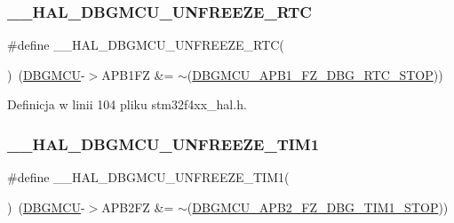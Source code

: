 \subsubsection{\texorpdfstring{\+\_\+\+\_\+\+H\+A\+L\+\_\+\+D\+B\+G\+M\+C\+U\+\_\+\+U\+N\+F\+R\+E\+E\+Z\+E\+\_\+\+R\+TC}{\_\_HAL\_DBGMCU\_UNFREEZE\_RTC}}
{\footnotesize\ttfamily \#define \+\_\+\+\_\+\+H\+A\+L\+\_\+\+D\+B\+G\+M\+C\+U\+\_\+\+U\+N\+F\+R\+E\+E\+Z\+E\+\_\+\+R\+TC(\begin{DoxyParamCaption}{ }\end{DoxyParamCaption})~(\hyperlink{group___peripheral__declaration_ga92ec6d9ec2251fda7d4ce09748cd74b4}{D\+B\+G\+M\+CU}-\/$>$A\+P\+B1\+FZ \&= $\sim$(\hyperlink{group___peripheral___registers___bits___definition_ga1e20246d389229ff46006b405bb56b1d}{D\+B\+G\+M\+C\+U\+\_\+\+A\+P\+B1\+\_\+\+F\+Z\+\_\+\+D\+B\+G\+\_\+\+R\+T\+C\+\_\+\+S\+T\+OP}))}



Definicja w linii 104 pliku stm32f4xx\+\_\+hal.\+h.

\mbox{\label{group___h_a_l___exported___macros_ga2f91eec9f9a424ab611be0e770c6692e}} 
\subsubsection{\texorpdfstring{\+\_\+\+\_\+\+H\+A\+L\+\_\+\+D\+B\+G\+M\+C\+U\+\_\+\+U\+N\+F\+R\+E\+E\+Z\+E\+\_\+\+T\+I\+M1}{\_\_HAL\_DBGMCU\_UNFREEZE\_TIM1}}
{\footnotesize\ttfamily \#define \+\_\+\+\_\+\+H\+A\+L\+\_\+\+D\+B\+G\+M\+C\+U\+\_\+\+U\+N\+F\+R\+E\+E\+Z\+E\+\_\+\+T\+I\+M1(\begin{DoxyParamCaption}{ }\end{DoxyParamCaption})~(\hyperlink{group___peripheral__declaration_ga92ec6d9ec2251fda7d4ce09748cd74b4}{D\+B\+G\+M\+CU}-\/$>$A\+P\+B2\+FZ \&= $\sim$(\hyperlink{group___peripheral___registers___bits___definition_ga3eb7be194b6ffb258b9e9f5ed08a931e}{D\+B\+G\+M\+C\+U\+\_\+\+A\+P\+B2\+\_\+\+F\+Z\+\_\+\+D\+B\+G\+\_\+\+T\+I\+M1\+\_\+\+S\+T\+OP}))}



